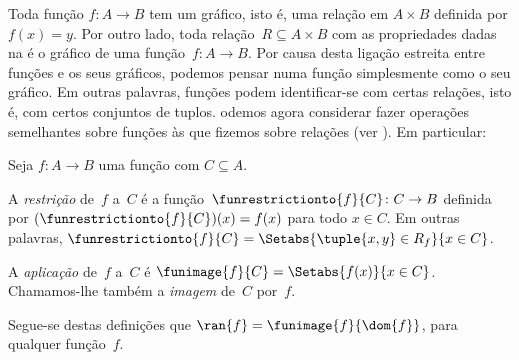 \documentclass[../../../include/open-logic-section]{subfiles}
\begin{document}
\begin{explain}
Toda função $f\colon A \to B$ tem um gráfico, isto é, uma relação em $A
\times B$ definida por $f(x) = y$. Por outro lado, toda relação~$R
\subseteq A \times B$ com as propriedades dadas na
 é o gráfico de uma função~$f \colon A \to
B$. Por causa desta ligação estreita entre funções e os seus
gráficos, podemos pensar numa função simplesmente como o seu gráfico. Em outras
palavras, funções podem identificar-se com certas relações, isto é, com
certos conjuntos de tuplos. odemos agora considerar fazer operações semelhantes sobre
funções às que fizemos sobre relações (ver
). Em particular:
\end{explain}

\begin{defn}
Seja $f \colon A \to B$ uma função com $C\subseteq A$.

A \emph{restrição} de~$f$ a~$C$ é a
função~$\funrestrictionto{f}{C}\colon C \to B$ definida por
$(\funrestrictionto{f}{C})(x) = f(x)$ para todo $x \in C$. Em outras
palavras, $\funrestrictionto{f}{C} = \Setabs{\tuple{x, y} \in R_f}{x \in
C}$.

A \emph{aplicação} de~$f$ a~$C$ é $\funimage{f}{C} =
\Setabs{f(x)}{x \in C}$. Chamamos-lhe também a \emph{imagem} de~$C$
por~$f$.
\end{defn}

\begin{explain}
Segue-se destas definições que $\ran{f} =
\funimage{f}{\dom{f}}$, para qualquer função~$f$.
\end{explain}
\end{document}
